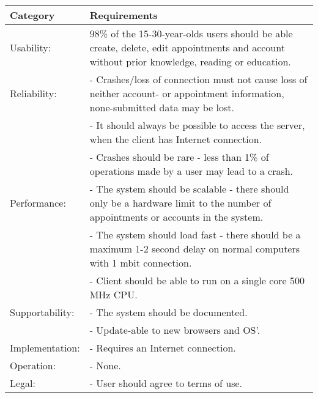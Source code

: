 {\tabulinesep=1.2mm
\begin{tabu}{ | p{3cm} | p{13cm} |}
    \hline
    Category	 			& 		Requirements \\\hline
    Usability:	  			& 		98\% of the 15-30-year-olds users should be able create, delete, edit appointments and account without prior knowledge, reading or education. \\\hline
    Reliability: 			& 		- Crashes/loss of connection must not cause loss of neither account- or appointment information, none-submitted data may be lost. \\
							&		- It should always be possible to access the server, when the client has Internet connection.\\
							&		- Crashes should be rare - less than 1\% of operations made by a user may lead to a crash. \\ \hline
	Performance:			&		- The system should be scalable - there should only be a hardware limit to the number of appointments or accounts in the system.\\
							&		- The system should load fast - there should be a maximum 1-2 second delay on normal computers with 1 mbit connection.\\
							&		- Client should be able to run on a single core 500 MHz CPU.\\ \hline
    Supportability: 		& 		- The system should be documented.  \\
    						&		- Update-able to new browsers and OS'. \\ \hline
	Implementation: 		&		- Requires an Internet connection.\\\hline
	Operation:				&	 	- None. \\\hline
	Legal:					&		- User should agree to terms of use.\\\hline
\end{tabu}
}

